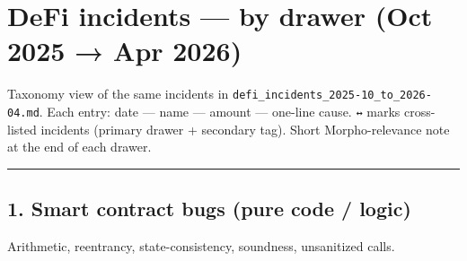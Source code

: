 \section{DeFi incidents --- by drawer (Oct 2025 → Apr 2026)}\label{defi-incidents-by-drawer-oct-2025-apr-2026}

Taxonomy view of the same incidents in \texttt{defi\_incidents\_2025-10\_to\_2026-04.md}. Each entry: date --- name --- amount --- one-line cause. \texttt{↔} marks cross-listed incidents (primary drawer + secondary tag). Short Morpho-relevance note at the end of each drawer.

\begin{center}\rule{0.5\linewidth}{0.5pt}\end{center}

\subsection{1. Smart contract bugs (pure code / logic)}\label{smart-contract-bugs-pure-code-logic}

Arithmetic, reentrancy, state-consistency, soundness, unsanitized calls.

